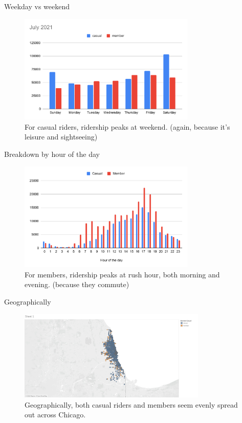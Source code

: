 \documentclass{beamer}
\begin{document}
\begin{frame}{Weekday vs weekend}
\begin{figure}
\includegraphics[width=0.75\textwidth]{July_2021}\\
For casual riders, ridership peaks at weekend. (again, because it's leisure and sightseeing)
\end{figure}
\end{frame}

\begin{frame}{Breakdown by hour of the day}
\begin{figure}
\includegraphics[width=0.75\textwidth]{BreakdownByHour}\\
For members, ridership peaks at rush hour, both morning and evening. (because they commute)
\end{figure}
\end{frame}

\begin{frame}{Geographically}
\begin{figure}
\includegraphics[width=0.8\textwidth]{Sheet_1}\\
Geographically, both casual riders and members seem evenly spread out across Chicago.
\end{figure}
\end{frame}
\end{document}
